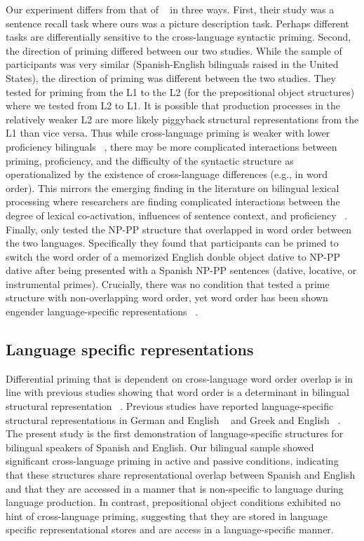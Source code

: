 Our experiment differs from that of ~\citep{Meijer2003} in three ways. First, their study was a sentence recall task where ours was a picture description task. Perhaps different tasks are differentially sensitive to the cross-language syntactic priming. Second, the direction of priming differed between our two studies. While the sample of participants was very similar (Spanish-English bilinguals raised in the United States), the direction of priming was different between the two studies. They tested for priming from the L1 to the L2 (for the prepositional object structures) where we tested from L2 to L1. It is possible that production processes in the relatively weaker L2 are more likely piggyback structural representations from the L1 than vice versa. Thus while cross-language priming is weaker with lower proficiency bilinguals ~\citep{Bernolet2013}, there may be more complicated interactions between priming, proficiency, and the difficulty of the syntactic structure as operationalized by the existence of cross-language differences (e.g., in word order). This mirrors the emerging finding in the literature on bilingual lexical processing where researchers are finding complicated interactions between the degree of lexical co-activation, influences of sentence context, and proficiency ~\citep[e.g.,][, and see also the results from Chapter 4 of the present dissertation]{Pivneva2014}. Finally,  \citet{Meijer2003} only tested the NP-PP structure that overlapped in word order between the two languages. Specifically they found that participants can be primed to switch the word order of a memorized English double object dative to NP-PP dative after being presented with a Spanish NP-PP sentences (dative, locative, or instrumental primes). Crucially, there was no condition that tested a prime structure with non-overlapping word order, yet word order has been shown engender language-specific representations ~\citep[e.g.,][]{Bernolet2007}. 

\subsection{Language specific representations}
\label{languagespecificrepresentations}

Differential priming that is dependent on cross-language word order overlap is in line with previous studies showing that word order is a determinant in bilingual structural representation ~\citep{Bernolet2007,Loebell2003, Salamoura2007}. Previous studies have reported language-specific structural representations in German and English ~\citep{Bernolet2007, Loebell2003} and Greek and English ~\citep{Salamoura2007}. The present study is the first demonstration of language-specific structures for bilingual speakers of Spanish and English. Our bilingual sample showed significant cross-language priming in active and passive conditions, indicating that these structures share representational overlap between Spanish and English and that they are accessed in a manner that is non-specific to language during language production. In contrast, prepositional object conditions exhibited no hint of cross-language priming, suggesting that they are stored in language specific representational stores and are access in a language-specific manner. 

